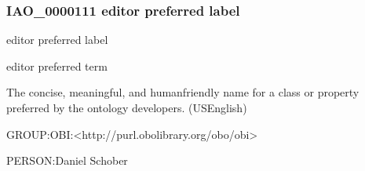 \documentclass[letterpaper,10pt,english]{sphinxmanual}
\begin{document}
\sphinxAtStartPar
{}
\begin{quote}

\ignorespaces \end{quote}


\subsubsection{IAO\_0000111 \sphinxhyphen{} editor preferred label}
\label{\detokenize{doc-IAO_0000111:iao-0000111-editor-preferred-label}}\label{\detokenize{doc-IAO_0000111:index-0}}\label{\detokenize{doc-IAO_0000111::doc}}
\begin{sphinxShadowBox}

\sphinxAtStartPar
editor preferred label
\end{sphinxShadowBox}

\begin{sphinxShadowBox}

\sphinxAtStartPar
editor preferred term
\end{sphinxShadowBox}

\begin{sphinxShadowBox}

\sphinxAtStartPar
The concise, meaningful, and human\sphinxhyphen{}friendly name for a class or property preferred by the ontology developers. (US\sphinxhyphen{}English)
\end{sphinxShadowBox}

\begin{sphinxShadowBox}

\sphinxAtStartPar
GROUP:OBI:\textless{}http://purl.obolibrary.org/obo/obi\textgreater{}
\end{sphinxShadowBox}

\begin{sphinxShadowBox}

\sphinxAtStartPar
PERSON:Daniel Schober
\end{sphinxShadowBox}
\begin{quote}

\ignorespaces \end{quote}
\end{document}
